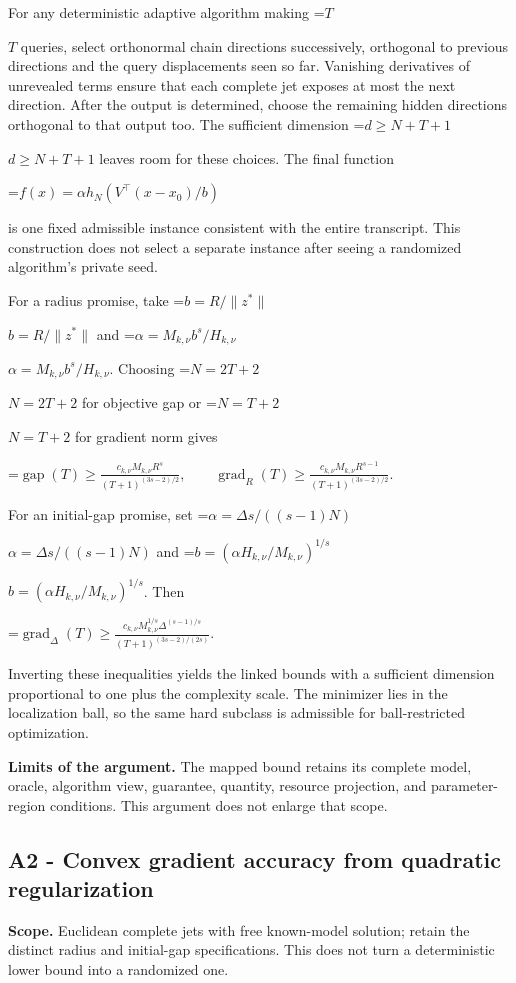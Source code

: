 \documentclass[10pt,a4paper]{article}
\newcommand{\AtlasMath}[1]{\par\begingroup\centering\setbox0=\hbox{$\displaystyle #1$}\ifdim\wd0>1.4\linewidth\typeout{ATLAS WIDE FORMULA: \the\wd0}\fi\ifdim\wd0>\linewidth\resizebox{\linewidth}{!}{\box0}\else\box0\fi\par\endgroup}
\newcommand{\AtlasInlineMath}[1]{\begingroup\setbox0=\hbox{$#1$}\ifdim\wd0>.4\linewidth\endgroup\AtlasMath{#1}\else\endgroup$#1$\fi}
\begin{document}
For any deterministic adaptive algorithm making \AtlasInlineMath{T} queries, select orthonormal chain directions successively, orthogonal to previous directions and the query displacements seen so far. Vanishing derivatives of unrevealed terms ensure that each complete jet exposes at most the next direction. After the output is determined, choose the remaining hidden directions orthogonal to that output too. The sufficient dimension \AtlasInlineMath{d\ge N+T+1} leaves room for these choices. The final function

\AtlasMath{f(x)=\alpha h_N(V^\top(x-x_0)/b)}

is one fixed admissible instance consistent with the entire transcript. This construction does not select a separate instance after seeing a randomized algorithm's private seed.

For a radius promise, take \AtlasInlineMath{b=R/\|z^*\|} and \AtlasInlineMath{\alpha=M_{k,\nu}b^s/H_{k,\nu}}. Choosing \AtlasInlineMath{N=2T+2} for objective gap or \AtlasInlineMath{N=T+2} for gradient norm gives

\AtlasMath{\operatorname{gap}(T)\ge\frac{c_{k,\nu}M_{k,\nu}R^s}{(T+1)^{(3s-2)/2}},\qquad
\operatorname{grad}_R(T)\ge\frac{c_{k,\nu}M_{k,\nu}R^{s-1}}{(T+1)^{(3s-2)/2}}.}

For an initial-gap promise, set \AtlasInlineMath{\alpha=\Delta s/((s-1)N)} and \AtlasInlineMath{b=(\alpha H_{k,\nu}/M_{k,\nu})^{1/s}}. Then

\AtlasMath{\operatorname{grad}_\Delta(T)\ge\frac{c_{k,\nu}M_{k,\nu}^{1/s}\Delta^{(s-1)/s}}{(T+1)^{(3s-2)/(2s)}}.}

Inverting these inequalities yields the linked bounds with a sufficient dimension proportional to one plus the complexity scale. The minimizer lies in the localization ball, so the same hard subclass is admissible for ball-restricted optimization.

\textbf{Limits of the argument.} The mapped bound retains its complete model, oracle, algorithm view, guarantee, quantity, resource projection, and parameter-region conditions. This argument does not enlarge that scope.

\subsection{A2 - Convex gradient accuracy from quadratic regularization}
\textbf{Scope.} Euclidean complete jets with free known-model solution; retain the distinct radius and initial-gap specifications. This does not turn a deterministic lower bound into a randomized one.
\end{document}
